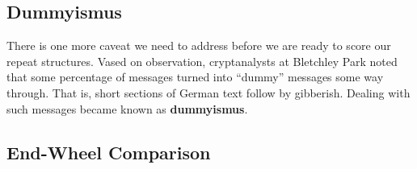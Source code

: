 \subsection{Dummyismus}
There is one more caveat we need to address before we are ready to score our repeat structures. Vased on observation, cryptanalysts at Bletchley Park noted that some percentage of messages turned into ``dummy'' messages some way through. That is, short sections of German text follow by gibberish. Dealing with such messages became known as {\bf{dummyismus}}.

\subsection{End-Wheel Comparison}
